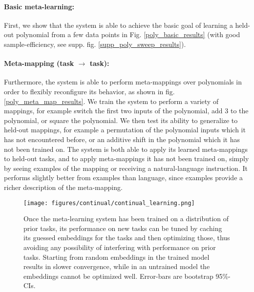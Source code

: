 \documentclass{article}
\begin{document}
\paragraph{Basic meta-learning:} First, we show that the system is able to achieve the basic goal of learning a held-out polynomial from a few data points in Fig. \ref{poly_basic_results} (with good sample-efficiency, see supp. fig. \ref{supp_poly_sweep_results}). \par 
\vspace{-0.7em}
\paragraph{Meta-mapping (task $\rightarrow$ task):} Furthermore, the system is able to perform meta-mappings over polynomials in order to flexibly reconfigure its behavior, as shown in fig. \ref{poly_meta_map_results}. We train the system to perform a variety of mappings, for example switch the first two inputs of the polynomial, add 3 to the polynomial, or square the polynomial. We then test its ability to generalize to held-out mappings, for example a permutation of the polynomial inputs which it has not encountered before, or an additive shift in the polynomial which it has not been trained on. The system is both able to apply its learned meta-mappings to held-out tasks, and to apply meta-mappings it has not been trained on, simply by seeing examples of the mapping or receiving a natural-language instruction. It performs slightly better from examples than language, since examples provide a richer description of the meta-mapping. \par 
\begin{figure}
\centering
\texttt{[image: figures/continual/continual\_learning.png]}
\caption{Once the meta-learning system has been trained on a distribution of prior tasks, its performance on new tasks can be tuned by caching its guessed embeddings for the tasks and then optimizing those, thus avoiding any possibility of interfering with performance on prior tasks. Starting from random embeddings in the trained model results in slower convergence, while in an untrained model the embeddings cannot be optimized well. Error-bars are bootstrap 95\%-CIs.}
\label{poly_continual_results}
\end{figure}
\vspace{-0.7em}
\end{document}
